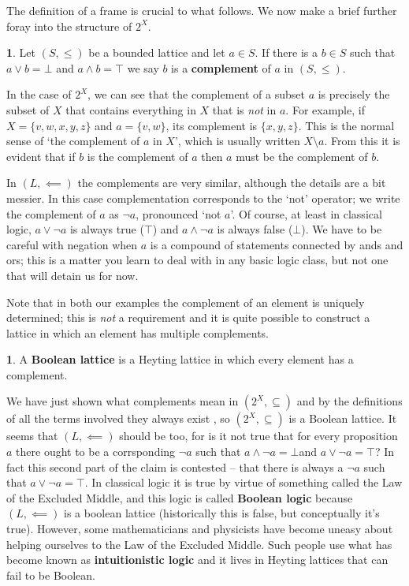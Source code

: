 \documentclass[oneside,english]{amsbook}
\numberwithin{section}{chapter}
\theoremstyle{plain}
\theoremstyle{definition}
\newtheorem{defn}[thm]{\protect\definitionname}
\providecommand{\definitionname}{Definition}
\begin{document}
The definition of a frame is crucial to what follows. We now make a brief further foray into the structure of $2^{X}$. 

\begin{defn} 
	Let $(S,\le)$ be a bounded lattice and let $a\in S$. If there is a $b\in S$ such that $a\lor b=\bot$ and $a\land b=\top$ we say $b$ is a \textbf{complement} of $a$ in $(S,\le)$. 
\end{defn} 

In the case of $2^{X}$, we can see that the complement of a subset $a$ is precisely the subset of $X$ that contains everything in $X$ that is \emph{not} in $a$. For example, if $X=\{v,w,x,y,z\}$ and $a=\{v,w\}$, its complement is $\{x,y,z\}$. This is the normal sense of `the complement of $a$ in $X$', which is usually written $X\setminus a$. From this it is evident that if $b$ is the complement of $a$ then $a$ must be the complement of $b$.

In $(L,\impliedby)$ the complements are very similar, although the details are a bit messier. In this case complementation corresponds to the `not' operator; we write the complement of $a$ as $\lnot a$, pronounced `not $a$'. Of course, at least in classical logic, $a\lor\lnot a$ is always true ($\top$) and $a\land\lnot a$ is always false ($\bot$). We have to be careful with negation when $a$ is a compound of statements connected by ands and ors; this is a matter you learn to deal with in any basic logic class, but not one that will detain us for now.

Note that in both our examples the complement of an element is uniquely determined; this is \emph{not} a requirement and it is quite possible to construct a lattice in which an element has multiple complements. 

\begin{defn} 
	A \textbf{Boolean lattice} is a Heyting lattice in which every element has a complement. 
\end{defn} 

We have just shown what complements mean in $(2^{X},\subseteq)$ and by the definitions of all the terms involved they always exist , so $(2^{X},\subseteq)$ is a Boolean lattice. It seems that $(L,\impliedby)$ should be too, for is it not true that for every proposition $a$ there ought to be a corrsponding $\lnot a$ such that $a\land\lnot a=\bot$and $a\lor\lnot a=\top$? In fact this second part of the claim is contested -- that there is always a $\lnot a$ such that $a\lor\lnot a=\top$. In classical logic it is true by virtue of something called the Law of the Excluded Middle, and this logic is called \textbf{Boolean logic }because $(L,\impliedby)$ is a boolean lattice (historically this is false, but conceptually it's true). However, some mathematicians and physicists have become uneasy about helping ourselves to the Law of the Excluded Middle. Such people use what has become known as \textbf{intuitionistic logic} and it lives in Heyting lattices that can fail to be Boolean.
\end{document}
